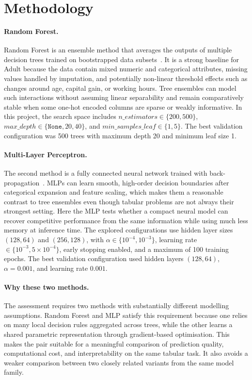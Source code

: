 \section{Methodology}
\label{sec:methodology}

\paragraph{Random Forest.}
Random Forest is an ensemble method that averages the outputs of multiple decision trees trained on bootstrapped data subsets~\cite{breiman2001randomforest}. It is a strong baseline for Adult because the data contain mixed numeric and categorical attributes, missing values handled by imputation, and potentially non-linear threshold effects such as changes around age, capital gain, or working hours. Tree ensembles can model such interactions without assuming linear separability and remain comparatively stable when some one-hot encoded columns are sparse or weakly informative. In this project, the search space includes $n\_estimators \in \{200, 500\}$, $max\_depth \in \{\texttt{None}, 20, 40\}$, and $min\_samples\_leaf \in \{1, 5\}$. The best validation configuration was 500 trees with maximum depth 20 and minimum leaf size 1.

\paragraph{Multi-Layer Perceptron.}
The second method is a fully connected neural network trained with back-propagation~\cite{rumelhart1986backprop}. MLPs can learn smooth, high-order decision boundaries after categorical expansion and feature scaling, which makes them a reasonable contrast to tree ensembles even though tabular problems are not always their strongest setting. Here the MLP tests whether a compact neural model can recover competitive performance from the same information while using much less memory at inference time. The explored configurations use hidden layer sizes $(128, 64)$ and $(256, 128)$, with $\alpha \in \{10^{-4}, 10^{-3}\}$, learning rate $\in \{10^{-3}, 5\times10^{-4}\}$, early stopping enabled, and a maximum of 100 training epochs. The best validation configuration used hidden layers $(128,64)$, $\alpha = 0.001$, and learning rate $0.001$.

\paragraph{Why these two methods.}
The assessment requires two methods with substantially different modelling assumptions. Random Forest and MLP satisfy this requirement because one relies on many local decision rules aggregated across trees, while the other learns a shared parametric representation through gradient-based optimisation. This makes the pair suitable for a meaningful comparison of prediction quality, computational cost, and interpretability on the same tabular task. It also avoids a weaker comparison between two closely related variants from the same model family.
